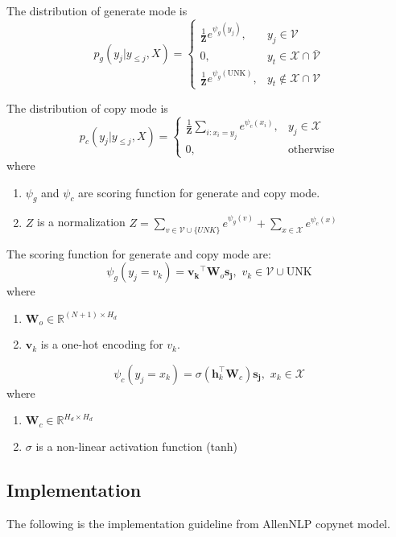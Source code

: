 \documentclass{article}
\begin{document}
  The distribution of generate mode is
  \[
    p_g(y_j|y_{\leq j}, X) =
    \begin{cases}
      \frac{1}{\mathbf{Z}} e^{{\psi}_g(y_j)}, & y_j \in \mathcal{V} \\
      0, & y_t \in \mathcal{X} \cap \mathcal{\bar{V}} \\
      \frac{1}{\mathbf{Z}} e^{{\psi}_g(\text{UNK})}, & y_t \not\in \mathcal{X} \cap \mathcal{V}
    \end{cases}
  \]

  The distribution of copy mode is
  \[
    p_c(y_j|y_{\leq j}, X) =
    \begin{cases}
      \frac{1}{\mathbf{Z}} \sum_{i:x_i=y_j} e^{{\psi}_c(x_i)}, & y_j \in \mathcal{X} \\
      0, & \text{otherwise}
    \end{cases}
  \]
  where
  \begin{enumerate}
    \item $\psi_g$ and $\psi_c$ are scoring function for generate and copy mode.
    \item $Z$ is a normalization $Z = \sum_{v \in \mathcal{V} \cup \{UNK\}} e^{\psi_g(v)} + \sum_{x \in \mathcal{X}} e^{\psi_c(x)}$
  \end{enumerate}

  The scoring function for generate and copy mode are:
  \[
    \psi_g(y_j = v_k) = \mathbf{v_k}^\intercal \mathbf{W}_o \mathbf{s_j},\,\, v_k \in \mathcal{V} \cup \text{UNK}
  \]
  where
  \begin{enumerate}
    \item $\mathbf{W}_o \in \mathbb{R}^{(N+1)\times H_d}$
    \item $\mathbf{v}_k$ is a one-hot encoding for $v_k$.
  \end{enumerate}
  \[
    \psi_c(y_j = x_k) = \sigma (\mathbf{h}_k^\intercal \mathbf{W}_c) \mathbf{s_j},\,\, x_k \in \mathcal{X}
  \]
  where
  \begin{enumerate}
    \item $\mathbf{W}_c \in \mathbb{R}^{H_d\times H_d}$
    \item $\sigma$ is a non-linear activation function (tanh)
  \end{enumerate}
\subsection{Implementation}
The following is the implementation guideline from AllenNLP copynet model.
\end{document}
